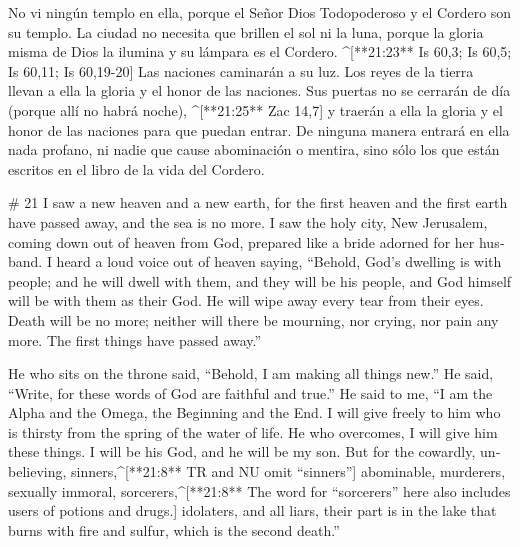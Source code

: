 \begin{paracols}{2}
 No vi ningún templo en ella, porque el Señor Dios Todopoderoso y el Cordero son su templo.  La ciudad no necesita que brillen el sol ni la luna, porque la gloria misma de Dios la ilumina y su lámpara es el Cordero. ^[**21:23** Is 60,3; Is 60,5; Is 60,11; Is 60,19-20]  Las naciones caminarán a su luz. Los reyes de la tierra llevan a ella la gloria y el honor de las naciones.  Sus puertas no se cerrarán de día (porque allí no habrá noche), ^[**21:25** Zac 14,7]  y traerán a ella la gloria y el honor de las naciones para que puedan entrar.  De ninguna manera entrará en ella nada profano, ni nadie que cause abominación o mentira, sino sólo los que están escritos en el libro de la vida del Cordero.

\switchcolumn
\begin{english}

# 21
 I saw a new heaven and a new earth, for the first heaven and the first earth have passed away, and the sea is no more.  I saw the holy city, New Jerusalem, coming down out of heaven from God, prepared like a bride adorned for her husband.  I heard a loud voice out of heaven saying, “Behold, God’s dwelling is with people; and he will dwell with them, and they will be his people, and God himself will be with them as their God.  He will wipe away every tear from their eyes. Death will be no more; neither will there be mourning, nor crying, nor pain any more. The first things have passed away.” 

 He who sits on the throne said, “Behold, I am making all things new.” He said, “Write, for these words of God are faithful and true.”  He said to me, “I am the Alpha and the Omega, the Beginning and the End. I will give freely to him who is thirsty from the spring of the water of life.  He who overcomes, I will give him these things. I will be his God, and he will be my son.  But for the cowardly, unbelieving, sinners,^[**21:8** TR and NU omit “sinners”] abominable, murderers, sexually immoral, sorcerers,^[**21:8** The word for “sorcerers” here also includes users of potions and drugs.] idolaters, and all liars, their part is in the lake that burns with fire and sulfur, which is the second death.” 


\end{english}
\end{paracols}
